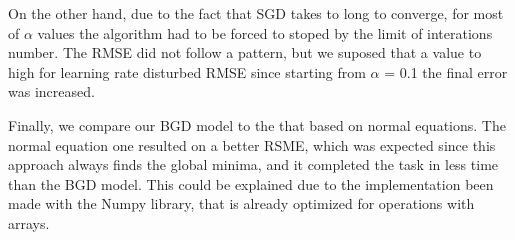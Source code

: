 \documentclass[conference]{IEEEtran}
\begin{document}
    On the other hand, due to the fact that SGD takes to long to converge, for most of $\alpha$ values the algorithm had to be forced to stoped by the limit of interations number. The RMSE did not follow a pattern, but we suposed that a value to high for learning rate disturbed RMSE since starting from  $\alpha$ = 0.1 the final error was increased. \par
    
    Finally, we compare our BGD model to the that based on normal equations. The normal equation one resulted on a better RSME, which was expected since this approach always finds the global minima, and it completed the task in less time than the BGD model. This could be explained due to the implementation been made with the Numpy library, that is already optimized for operations with arrays.
\end{document}
